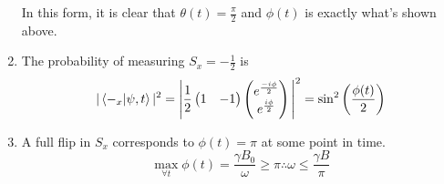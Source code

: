 \begin{sol}
\begin{enumerate}[label=\textbf{(\alph*)}]
\begin{equation}
\end{equation} 
 In this form, it is clear that $\theta(t)=\frac{\pi}{2}$ and $\phi(t)$ is exactly what's shown above.
 \item
 The probability of measuring $S_x=-\frac{1}{2}$ is
 \begin{equation}
	|\braket{-_x}{\psi,t}|^2=\Bigg|\frac{1}{2}\begin{pmatrix}
 1&-1
 \end{pmatrix}\begin{pmatrix}
 e^{\frac{-i\phi}{2}}\\e^{\frac{i\phi}{2}}
 \end{pmatrix}\Bigg|^2=\sin^2\left(\frac{\phi(t)}{2}\right)
\end{equation}
 \item
 A full flip in $S_x$ corresponds to $\phi(t)=\pi$ at some point in time. 
 \begin{equation}
	\max_{\forall t}\phi(t)=\frac{\gamma B_0}{\omega}\geq\pi\therefore\omega\leq\frac{\gamma B}{\pi}
\end{equation}
 
\end{enumerate}
\end{sol}